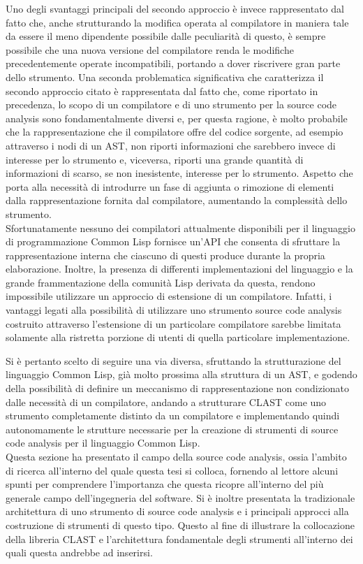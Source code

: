 Uno degli svantaggi principali del secondo approccio è invece rappresentato dal
fatto che, anche strutturando la modifica operata al compilatore in maniera tale
da essere il meno dipendente possibile dalle peculiarità di questo, è sempre
possibile che una nuova versione del compilatore renda le modifiche
precedentemente operate incompatibili, portando a dover riscrivere gran parte
dello strumento. Una seconda problematica significativa che caratterizza il
secondo approccio citato è rappresentata dal fatto che, come riportato in
precedenza, lo scopo di un compilatore e di uno strumento per la source code
analysis sono fondamentalmente diversi e, per questa ragione, è molto probabile
che la rappresentazione che il compilatore offre del codice sorgente, ad esempio
attraverso i nodi di un AST, non riporti informazioni che sarebbero invece di
interesse per lo strumento e, viceversa, riporti una grande quantità di
informazioni di scarso, se non inesistente, interesse per lo strumento. Aspetto
che porta alla necessità di introdurre un fase di aggiunta o rimozione di
elementi dalla rappresentazione fornita dal compilatore, aumentando la
complessità dello strumento.\\

Sfortunatamente nessuno dei compilatori attualmente disponibili per il
linguaggio di programmazione Common Lisp fornisce un'API che consenta di
sfruttare la rappresentazione interna che ciascuno di questi produce durante la
propria elaborazione. Inoltre, la presenza di differenti implementazioni del
linguaggio e la grande frammentazione della comunità Lisp derivata da questa,
rendono impossibile utilizzare un approccio di estensione di un compilatore.
Infatti, i vantaggi legati alla possibilità di utilizzare uno strumento source
code analysis costruito attraverso l'estensione di un particolare compilatore
sarebbe limitata solamente alla ristretta porzione di utenti di quella
particolare implementazione.

Si è pertanto scelto di seguire una via diversa, sfruttando la strutturazione
del linguaggio Common Lisp, già molto prossima alla struttura di un AST, e
godendo della possibilità di definire un meccanismo di rappresentazione non
condizionato dalle necessità di un compilatore, andando a strutturare CLAST come
uno strumento completamente distinto da un compilatore e implementando quindi
autonomamente le strutture necessarie per la creazione di strumenti di source
code analysis per il linguaggio Common Lisp.\\

Questa sezione ha presentato il campo della source code analysis, ossia l'ambito
di ricerca all'interno del quale questa tesi si colloca, fornendo al lettore
alcuni spunti per comprendere l'importanza che questa ricopre all'interno del
più generale campo dell'ingegneria del software. Si è inoltre presentata la
tradizionale architettura di uno strumento di source code analysis e i
principali approcci alla costruzione di strumenti di questo tipo. Questo al fine
di illustrare la collocazione della libreria CLAST e l'architettura fondamentale degli strumenti all'interno dei quali questa andrebbe ad inserirsi.
